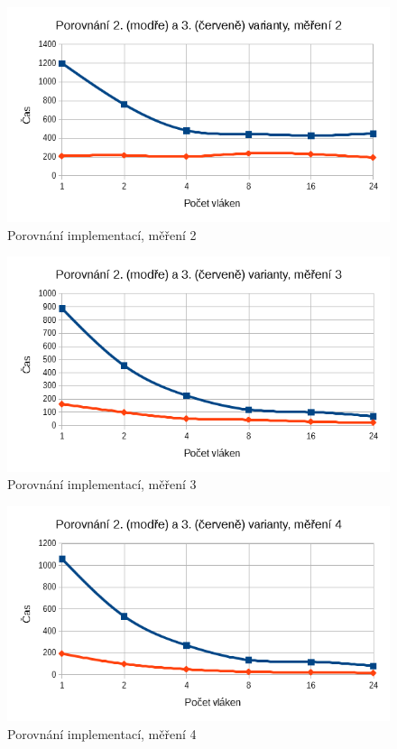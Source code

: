 \documentclass[12pt]{article}
\begin{document}
\begin{figure}
  \begin{center}
      \includegraphics[width=12cm]{images/vs2.png}	
    \caption{Porovnání implementací, měření 2}
  \end{center}
\end{figure}

\begin{figure}
  \begin{center}
      \includegraphics[width=12cm]{images/vs3.png}	
    \caption{Porovnání implementací, měření 3}
  \end{center}
\end{figure}

\begin{figure}
  \begin{center}
      \includegraphics[width=12cm]{images/vs4.png}	
    \caption{Porovnání implementací, měření 4}
  \end{center}
\end{figure}
\end{document}
